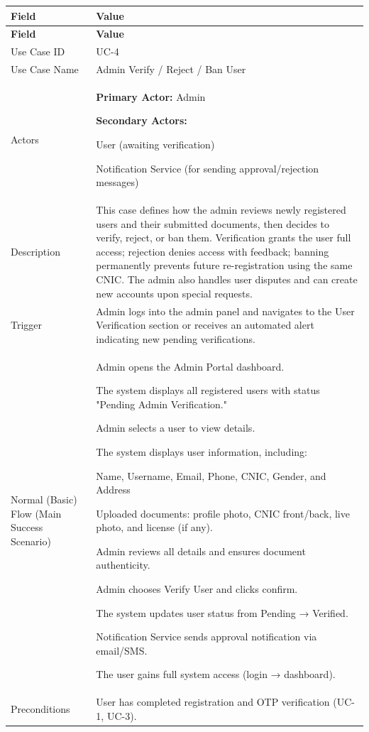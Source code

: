 \begin{longtable}{|p{3.5cm}|p{12cm}|}
\hline
\rowcolor{lightgray!30}
\textbf{Field} & \textbf{Value} \\
\hline
\endfirsthead
\hline
\rowcolor{lightgray!30}
\textbf{Field} & \textbf{Value} \\
\hline
\endhead
\hline
\endfoot
Use Case ID & UC-4 \\
\hline
Use Case Name & Admin Verify / Reject / Ban User \\
\hline
Actors &
\textbf{Primary Actor:} Admin

\textbf{Secondary Actors:}

User (awaiting verification)

Notification Service (for sending approval/rejection messages) \\
\hline
Description &
This case defines how the admin reviews newly registered users and their submitted documents, then decides to verify, reject, or ban them. Verification grants the user full access; rejection denies access with feedback; banning permanently prevents future re-registration using the same CNIC. The admin also handles user disputes and can create new accounts upon special requests. \\
\hline
Trigger &
Admin logs into the admin panel and navigates to the User Verification section or receives an automated alert indicating new pending verifications. \\
\hline
Normal (Basic) Flow (Main Success Scenario) &
Admin opens the Admin Portal dashboard.

The system displays all registered users with status "Pending Admin Verification."

Admin selects a user to view details.

The system displays user information, including:

Name, Username, Email, Phone, CNIC, Gender, and Address

Uploaded documents: profile photo, CNIC front/back, live photo, and license (if any).

Admin reviews all details and ensures document authenticity.

Admin chooses Verify User and clicks confirm.

The system updates user status from Pending → Verified.

Notification Service sends approval notification via email/SMS.

The user gains full system access (login → dashboard). \\
\hline
Preconditions &
User has completed registration and OTP verification (UC-1, UC-3).


\end{longtable}
